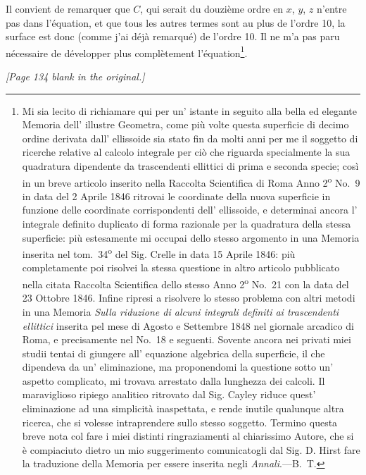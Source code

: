 \documentclass[11pt]{article}
\begin{document}
Il convient de remarquer que $C$, qui serait du douzième ordre en $x$, $y$, $z$ n'entre pas dans l'équation, et que tous les autres termes sont au plus de l'ordre 10, la surface est donc (comme j'ai déjà remarqué) de l'ordre 10. Il ne m'a pas paru nécessaire de développer plus complètement l'équation\footnote{Mi sia lecito di richiamare qui per un' istante in seguito alla bella ed elegante Memoria dell' illustre Geometra, come più volte questa superficie di decimo ordine derivata dall' ellissoide sia stato fin da molti anni per me il soggetto di ricerche relative al calcolo integrale per ciò che riguarda specialmente la sua quadratura dipendente da trascendenti ellittici di prima e seconda specie; così in un breve articolo inserito nella Raccolta Scientifica di Roma Anno 2\textsuperscript{o} No.~9 in data del 2 Aprile 1846 ritrovai le coordinate della nuova superficie in funzione delle coordinate corrispondenti dell' ellissoide, e determinai ancora l' integrale definito duplicato di forma razionale per la quadratura della stessa superficie: più estesamente mi occupai dello stesso argomento in una Memoria inserita nel tom.~34\textsuperscript{o} del Sig. Crelle in data 15 Aprile 1846: più completamente poi risolvei la stessa questione in altro articolo pubblicato nella citata Raccolta Scientifica dello stesso Anno 2\textsuperscript{o} No.~21 con la data del 23 Ottobre 1846. Infine ripresi a risolvere lo stesso problema con altri metodi in una Memoria \textit{Sulla riduzione di alcuni integrali definiti ai trascendenti ellittici} inserita pel mese di Agosto e Settembre 1848 nel giornale arcadico di Roma, e precisamente nel No.~18 e seguenti. Sovente ancora nei privati miei studii tentai di giungere all' equazione algebrica della superficie, il che dipendeva da un' eliminazione, ma proponendomi la questione sotto un' aspetto complicato, mi trovava arrestato dalla lunghezza dei calcoli. Il maraviglioso ripiego analitico ritrovato dal Sig. Cayley riduce quest' eliminazione ad una simplicità inaspettata, e rende inutile qualunque altra ricerca, che si volesse intraprendere sullo stesso soggetto. Termino questa breve nota col fare i miei distinti ringraziamenti al chiarissimo Autore, che si è compiaciuto dietro un mio suggerimento comunicatogli dal Sig. D. Hirst fare la traduzione della Memoria per essere inserita negli \textit{Annali}.---B.~T.}.

\newpage

\thispagestyle{empty}
\vspace*{\fill}
\begin{center}\textit{[Page 134 blank in the original.]}\end{center}
\vspace*{\fill}
\newpage
\end{document}
